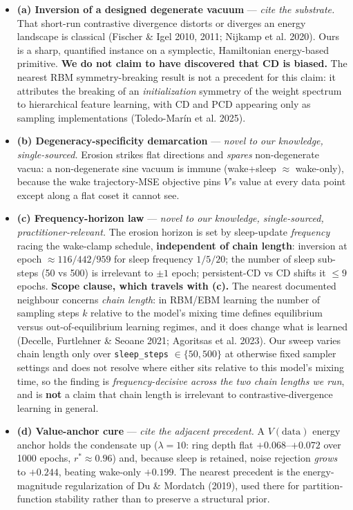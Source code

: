 \documentclass{article}
\begin{document}
\begin{itemize}
\item \textbf{(a) Inversion of a designed degenerate vacuum} --- \emph{cite the substrate.} That short-run contrastive divergence distorts or diverges an energy landscape is classical (Fischer \& Igel 2010, 2011; Nijkamp et al. 2020). Ours is a sharp, quantified instance on a symplectic, Hamiltonian energy-based primitive. \textbf{We do not claim to have discovered that CD is biased.} The nearest RBM symmetry-breaking result is not a precedent for this claim: it attributes the breaking of an \emph{initialization} symmetry of the weight spectrum to hierarchical feature learning, with CD and PCD appearing only as sampling implementations (Toledo-Mar\'in et al. 2025).
\item \textbf{(b) Degeneracy-specificity demarcation} --- \emph{novel to our knowledge, single-sourced.} Erosion strikes flat directions and \emph{spares} non-degenerate vacua: a non-degenerate sine vacuum is immune (wake+sleep $\approx$ wake-only), because the wake trajectory-MSE objective pins $V$'s value at every data point except along a flat coset it cannot see.
\item \textbf{(c) Frequency-horizon law} --- \emph{novel to our knowledge, single-sourced, practitioner-relevant.} The erosion horizon is set by sleep-update \emph{frequency} racing the wake-clamp schedule, \textbf{independent of chain length}: inversion at epoch $\approx116/442/959$ for sleep frequency $1/5/20$; the number of sleep sub-steps (50 vs 500) is irrelevant to $\pm1$ epoch; persistent-CD vs CD shifts it $\le9$ epochs. \textbf{Scope clause, which travels with (c).} The nearest documented neighbour concerns \emph{chain length}: in RBM/EBM learning the number of sampling steps $k$ relative to the model's mixing time defines equilibrium versus out-of-equilibrium learning regimes, and it does change what is learned (Decelle, Furtlehner \& Seoane 2021; Agoritsas et al. 2023). Our sweep varies chain length only over \texttt{sleep\_steps} $\in\{50,500\}$ at otherwise fixed sampler settings and does not resolve where either sits relative to this model's mixing time, so the finding is \emph{frequency-decisive across the two chain lengths we run}, and is \textbf{not} a claim that chain length is irrelevant to contrastive-divergence learning in general.
\item \textbf{(d) Value-anchor cure} --- \emph{cite the adjacent precedent.} A $V(\text{data})$ energy anchor holds the condensate up ($\lambda=10$: ring depth flat $+0.068$--$+0.072$ over 1000 epochs, $r^*\approx0.96$) and, because sleep is retained, noise rejection \emph{grows} to $+0.244$, beating wake-only $+0.199$. The nearest precedent is the energy-magnitude regularization of Du \& Mordatch (2019), used there for partition-function stability rather than to preserve a structural prior.
\end{itemize}
\end{document}
